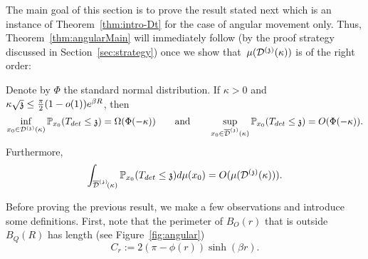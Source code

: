 The main goal of this section is to prove the result stated next
which is an instance of Theorem~\ref{thm:intro-Dt} for the case of angular movement only.
Thus, Theorem~\ref{thm:angularMain} will immediately follow  (by the proof strategy discussed in Section~\ref{sec:strategy}) once we show that~$\mu(\dt(\kappa))$ is of the right order:
\begin{theorem}\label{thm:mainangular}
Denote by $\Phi$ the standard normal distribution.
If $\kappa>0$ and 
  $\kappa\sqrt{\ss}\leq\frac{\pi}{2}(1-o(1))e^{\beta R}$, then
\[
\inf_{x_0\in\dt(\kappa)}\P_{x_0}(T_{det}\leq \ss)=\Omega(\Phi(-\kappa))
\qquad\text{and}\qquad
\sup_{x_0\in\ndt(\kappa)}\P_{x_0}(T_{det}\leq \ss)  = O(\Phi(-\kappa)).
\]
Furthermore,
\[
\int_{\ndt\!(\kappa)} \PP_{x_0}(T_{det}\le\ss)d\mu(x_0) = O(\mu(\dt(\kappa))).
\]
\end{theorem}

Before proving the previous result, we make a few observations and introduce some definitions. 
First, note that the perimeter of $B_{O}(r)$ that is outside $B_Q(R)$ has length (see Figure~\ref{fig:angular}) 
\[
C_{r}:=2(\pi-\phi(r))\sinh(\beta r).
\]


